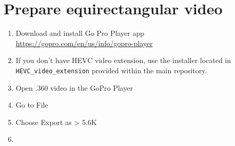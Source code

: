 \documentclass[a4paper,12pt]{book}
\begin{document}
\chapter{Prepare equirectangular video}
\begin{enumerate}
	\item Download and install Go Pro Player app \url{https://gopro.com/en/us/info/gopro-player}
	\item If you don't have HEVC video extension, use the installer located in \verb|HEVC_video_extension| provided within the main repository.
	\item Open .360 video in the GoPro Player
	 \item \begin{minipage}[t]{\linewidth}
	 	\raggedright
	 	\medskip	
	 \end{minipage}
	 Go to File
	 \item \begin{minipage}[t]{\linewidth}
	 	\raggedright
	 	\medskip	
	 \end{minipage}
	 Choose Export as > 5.6K
	 \item \begin{minipage}[t]{\linewidth}
	 	\raggedright
\end{minipage}
\end{enumerate}
\end{document}
